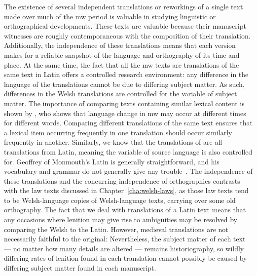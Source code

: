 The existence of several independent translations or reworkings of a single text made over much of the \gls{mw} period is valuable in studying linguistic or orthographical developments.
These texts are valuable because their manuscript witnesses are roughly contemporaneous with the composition of their translation.
Additionally, the independence of these translations means that each version makes for a reliable snapshot of the language and orthography of its time and place.
At the same time, the fact that all the \gls{mw} texts are translations of the same text in Latin offers a controlled research environment:  any difference in the language of the translations cannot be due to differing subject matter.
As such, differences in the Welsh translations are controlled for the variable of subject matter.
The importance of comparing texts containing similar lexical content is shown by \textcite{Wil_Lexical05}, who shows that language change in \gls{mw} may occur at different times for different words.
Comparing different translations of the same text ensures that a lexical item occurring frequently in one translation should occur similarly frequently in another.
Similarly, we know that the translations of are all translations from Latin, meaning the variable of source language is also controlled for.
Geoffrey of Monmouth's Latin is generally straightforward, and his vocabulary and grammar do not generally give any trouble~\autocite[lxxvi]{Geo_History09}.
The independence of these translations and the concurring independence of orthographies contrasts with the law texts discussed in Chapter~\ref{cha:welsh-laws}, as those law texts tend to be Welsh-language copies of Welsh-language texts, carrying over some old orthography.
The fact that we deal with translations of a Latin text means that any occasions where lenition may give rise to ambiguities may be resolved by comparing the Welsh to the Latin.
However, medieval translations are not necessarily faithful to the original:
Nevertheless, the subject matter of each text --- no matter how many details are altered --- remains historiography, so wildly differing rates of lenition found in each translation cannot possibly be caused by differing subject matter found in each manuscript.


